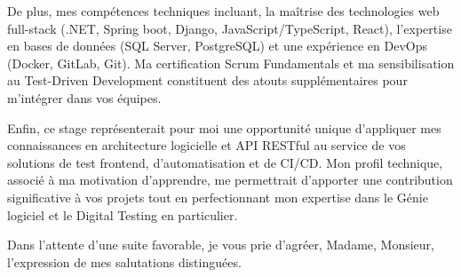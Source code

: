 \documentclass[11pt, a4paper]{awesome-cv}
\begin{document}
\begin{cvletter}
\indent De plus, mes compétences techniques incluant, la maîtrise des technologies web full-stack (.NET, Spring boot, Django, JavaScript/TypeScript, React), l'expertise en bases de données (SQL Server, PostgreSQL) et une expérience en DevOps (Docker, GitLab, Git). Ma certification Scrum Fundamentals et ma sensibilisation au Test-Driven Development constituent des atouts supplémentaires pour m'intégrer dans vos équipes.

\indent Enfin, ce stage représenterait pour moi une opportunité unique d'appliquer mes connaissances en architecture logicielle et API RESTful au service de vos solutions de test frontend, d'automatisation et de CI/CD. Mon profil technique, associé à ma motivation d'apprendre, me permettrait d'apporter une contribution significative à vos projets tout en perfectionnant mon expertise dans le Génie logiciel et le Digital Testing en particulier.

Dans l'attente d'une suite favorable, je vous prie d'agréer, Madame, Monsieur, l'expression de mes salutations distinguées.

\end{cvletter}

\makeletterclosing
\end{document}
